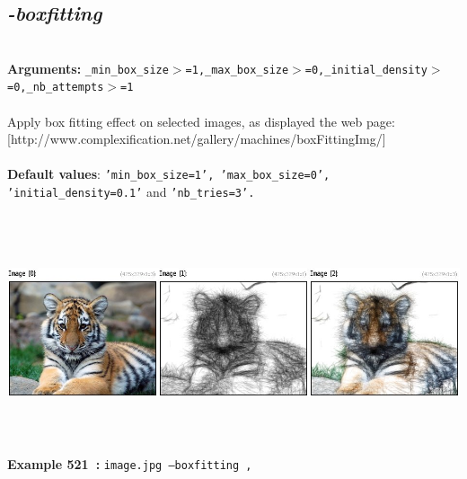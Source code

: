\documentclass[a4paper,11pt,twoside]{book}
\begin{document}
\subsection{\emph{-boxfitting} }\vspace*{-0.5em}
~\\\textbf{Arguments: } 
{\small \texttt{\_min\_box\_size$>$=1,\_max\_box\_size$>$=0,\_initial\_density$>$=0,\_nb\_attempts$>$=1}}\\~\\
Apply box fitting effect on selected images, as displayed the web page:
[http://www.complexification.net/gallery/machines/boxFittingImg/]
~\\~\\\textbf{Default values}: {\small \texttt{'min\_box\_size=1', 'max\_box\_size=0', 'initial\_density=0.1'} and \texttt{'nb\_tries=3'.}}
\begin{center}\includegraphics[keepaspectratio=true,height=7cm,width=\textwidth]{img/gmic_def521.jpg}\\
{\footnotesize \textbf{Example 521~:} \texttt{image.jpg --boxfitting ,}}
\end{center}
\end{document}
